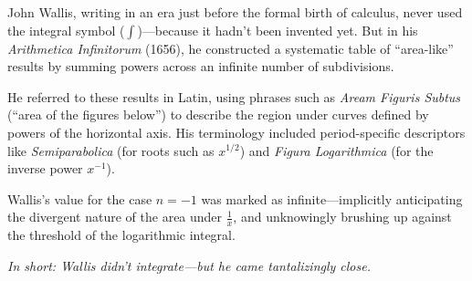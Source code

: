 \begin{tcolorbox}[colback=gray!5!white, colframe=black, title=\textbf{Historical Sidenote: Wallis and the Ghost of Integration}, fonttitle=\bfseries, arc=1.5mm, boxrule=0.4pt]

    John Wallis, writing in an era just before the formal birth of calculus, never used the integral symbol (\( \int \))—because it hadn’t been invented yet. But in his \textit{Arithmetica Infinitorum} (1656), he constructed a systematic table of “area-like” results by summing powers across an infinite number of subdivisions.
    
    He referred to these results in Latin, using phrases such as \textit{Aream Figuris Subtus} (“area of the figures below”) to describe the region under curves defined by powers of the horizontal axis. His terminology included period-specific descriptors like \textit{Semiparabolica} (for roots such as \( x^{1/2} \)) and \textit{Figura Logarithmica} (for the inverse power \( x^{-1} \)).
    
    Wallis's value for the case \( n = -1 \) was marked as infinite—implicitly anticipating the divergent nature of the area under \( \frac{1}{x} \), and unknowingly brushing up against the threshold of the logarithmic integral.
    
    \vspace{0.3em}
    \textit{In short: Wallis didn’t integrate—but he came tantalizingly close.}
\end{tcolorbox}



